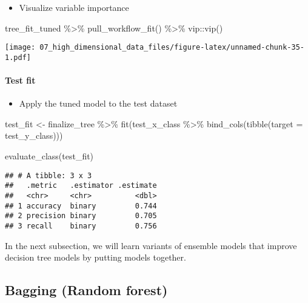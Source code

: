 \documentclass[
]{book}
\newenvironment{Shaded}{\begin{snugshade}}{\end{snugshade}}
\newcommand{\AttributeTok}[1]{\textcolor[rgb]{0.77,0.63,0.00}{#1}}
\newcommand{\FunctionTok}[1]{\textcolor[rgb]{0.00,0.00,0.00}{#1}}
\newcommand{\NormalTok}[1]{#1}
\newcommand{\OtherTok}[1]{\textcolor[rgb]{0.56,0.35,0.01}{#1}}
\newcommand{\SpecialCharTok}[1]{\textcolor[rgb]{0.00,0.00,0.00}{#1}}
\providecommand{\tightlist}{%
  \setlength{\itemsep}{0pt}\setlength{\parskip}{0pt}}
\begin{document}
\begin{itemize}
\tightlist
\item
  Visualize variable importance
\end{itemize}

\begin{Shaded}
\begin{Highlighting}[]
\NormalTok{tree\_fit\_tuned }\SpecialCharTok{\%\textgreater{}\%}
  \FunctionTok{pull\_workflow\_fit}\NormalTok{() }\SpecialCharTok{\%\textgreater{}\%}
\NormalTok{  vip}\SpecialCharTok{::}\FunctionTok{vip}\NormalTok{()}
\end{Highlighting}
\end{Shaded}

\texttt{[image: 07\_high\_dimensional\_data\_files/figure-latex/unnamed-chunk-35-1.pdf]}

\hypertarget{test-fit-1}{%
\paragraph{Test fit}\label{test-fit-1}}

\begin{itemize}
\tightlist
\item
  Apply the tuned model to the test dataset
\end{itemize}

\begin{Shaded}
\begin{Highlighting}[]
\NormalTok{test\_fit }\OtherTok{\textless{}{-}}\NormalTok{ finalize\_tree }\SpecialCharTok{\%\textgreater{}\%} 
  \FunctionTok{fit}\NormalTok{(test\_x\_class }\SpecialCharTok{\%\textgreater{}\%} \FunctionTok{bind\_cols}\NormalTok{(}\FunctionTok{tibble}\NormalTok{(}\AttributeTok{target =}\NormalTok{ test\_y\_class)))}

\FunctionTok{evaluate\_class}\NormalTok{(test\_fit)}
\end{Highlighting}
\end{Shaded}

\begin{verbatim}
## # A tibble: 3 x 3
##   .metric   .estimator .estimate
##   <chr>     <chr>          <dbl>
## 1 accuracy  binary         0.744
## 2 precision binary         0.705
## 3 recall    binary         0.756
\end{verbatim}

In the next subsection, we will learn variants of ensemble models that improve decision tree models by putting models together.

\hypertarget{bagging-random-forest}{%
\subsection{Bagging (Random forest)}\label{bagging-random-forest}}
\end{document}
